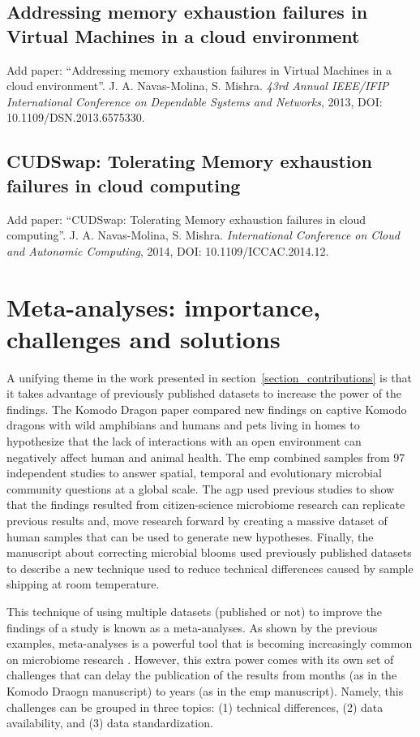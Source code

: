 \documentclass[12pt,chapterheads]{ucsd}
\begin{document}
% 
% 
\section{Addressing memory exhaustion failures in Virtual Machines in a cloud environment}\label{section_memory_exhaustion}
Add paper: ``Addressing memory exhaustion failures in Virtual Machines in a cloud environment''. J. A. Navas-Molina, S. Mishra. \emph{43rd Annual IEEE/IFIP International Conference on Dependable Systems and Networks}, 2013, DOI: 10.1109/DSN.2013.6575330.
\section{CUDSwap: Tolerating Memory exhaustion failures in cloud computing}\label{section_cudswap}
Add paper: ``CUDSwap: Tolerating Memory exhaustion failures in cloud computing''. J. A. Navas-Molina, S. Mishra. \emph{International Conference on Cloud and Autonomic Computing}, 2014, DOI: 10.1109/ICCAC.2014.12.

\chapter{Meta-analyses: importance, challenges and solutions}\label{chapter_qiita}
\glsresetall
A unifying theme in the work presented in section~\ref{section_contributions}
is that it takes advantage of previously published datasets to increase the power
of the findings. The Komodo Dragon paper \cite{Hyde2016} compared new findings
on captive Komodo dragons with wild amphibians \cite{Kueneman2014} and humans and
pets living in homes \cite{Lax2014} to hypothesize that the lack of interactions
with an open environment can negatively affect human and animal health. The \gls{emp}
\cite{Gilbert2010, Gilbert2014, Thompson2017} combined samples from 97 independent
studies to answer spatial, temporal and evolutionary microbial community questions at a global scale.
The \gls{agp} used previous studies to show that the findings resulted from citizen-science
microbiome research can replicate previous results and, move research forward
by creating a massive dataset of human samples that can be used to
generate new hypotheses. Finally, the manuscript about correcting microbial blooms
\cite{Amir2017Bloom} used previously published datasets to describe a new technique
used to reduce technical differences caused by sample shipping at room temperature.

This technique of using multiple datasets (published or not)
to improve the findings of a study is known as a meta-analyses. As shown
by the previous examples, meta-analyses is a powerful tool that is becoming increasingly
common on microbiome research \cite{Lozupone2007, Ley2008, Sinha2017}. However,
this extra power comes with its own set of challenges that can delay the publication
of the results from months (as in the Komodo Draogn manuscript) to years (as in
the \gls{emp} manuscript). Namely, this challenges can be grouped in three topics:
(1) technical differences, (2) data availability, and (3) data standardization.
\end{document}
